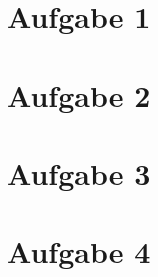 \documentclass[10pt,a4paper]{article}
\date{\today}
\begin{document}
	
	\section*{Aufgabe 1}
	
	\pagebreak
	
	\section*{Aufgabe 2}
	
	\pagebreak
	
	\section*{Aufgabe 3}
	
	\pagebreak
	
	\section*{Aufgabe 4}
	
	\pagebreak
	
\end{document}
